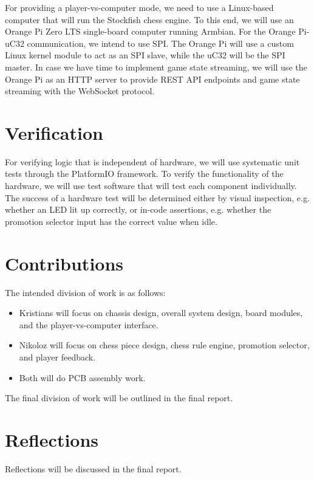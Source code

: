 \documentclass{article}
\begin{document}
For providing a player-vs-computer mode, we need to use a Linux-based computer that will run the Stockfish chess engine. To this end, we will use an Orange Pi Zero LTS single-board computer running Armbian. For the Orange Pi-uC32 communication, we intend to use SPI. The Orange Pi will use a custom Linux kernel module to act as an SPI slave, while the uC32 will be the SPI master. In case we have time to implement game state streaming, we will use the Orange Pi as an HTTP server to provide REST API endpoints and game state streaming with the WebSocket protocol.

\section{Verification}

For verifying logic that is independent of hardware, we will use systematic unit tests through the PlatformIO framework. To verify the functionality of the hardware, we will use test software that will test each component individually. The success of a hardware test will be determined either by visual inspection, e.g. whether an LED lit up correctly, or in-code assertions, e.g. whether the promotion selector input has the correct value when idle.

\section{Contributions}

The intended division of work is as follows:
\begin{itemize}
	\item Kristians will focus on chassis design, overall system design, board modules, and the player-vs-computer interface.
	\item Nikoloz will focus on chess piece design, chess rule engine, promotion selector, and player feedback.
	\item Both will do PCB assembly work.
\end{itemize}

The final division of work will be outlined in the final report.

\section{Reflections}

Reflections will be discussed in the final report.
\end{document}
